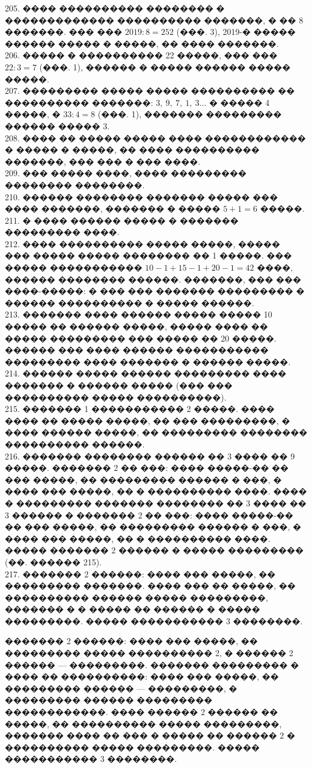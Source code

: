\documentclass[12pt]{article}
\begin{document}
205. ���� ���������� �������� � ������������� ���������� �������, � �� 8 �������. ��� ��� $2019:8=252$ (���. 3), 2019-� ����� ������ ����� � �����, �� ���� �������.\\
206. ����� � ���������� 22 �����, ��� ��� $22:3=7$ (���. 1), ������ � ����� ������ ����� �����.\\
207. ��������� ����� ����� ���������� �� ���������� �������: $3,\ 9,\ 7,\ 1,\ 3\ldots$ � ����� 4 �����, � $33:4=8$ (���. 1), ������� ��������� ������ ����� 3.\\
208. ���� �� ����� ����� ���� ������������ � ����� � �����, �� ���� ���������� �������, ��� ��� � ��� ����.\\
209. ��� ����� ����, ���� ��������� �������� ��������.\\
210. ������ �������� ������� ����� ��� ���� �������, ������� � ����� $5+1=6$ �����.\\
211. � ���� ������ ����� � ������� ��������� ����.\\
212. ���� ���������� ����� �����, ����� ��� ����� ����� �������� �� 1 �����. ��� ����� ����������� $10-1+15-1+20-1=42$ ����, ������ �������� ������. �������, ��� ��� ����-�����: � ��� ��� ������� ��������� � ������ ���������� � ����� ������.\\
213. ������� ���� ������ ����� ����� 10 ����� �� ������ �����, ����� ���� �� ����� ��������� ��� ����� �� 20 �����. ������ ��� ���� ������ ����������� ��������� ���� ������� � ������ �����.\\
214. ������ ����� ������ ��������� ���� ������� � ������ ����� (��� ��� ���������� ����� ����������).\\
215. ������� 1 ����������� 2 �����. ���� ���� �� ����� �����, �� ��� ���������, � ���� ������ �����, �� ��������� �������� ���������� ������.\\
216. ������� �������� ������ �� 3 ���� �� 9 �����. ������� 2 �� ���: ���� �����-�� �� ��� �����, �� ��������� ������ � ���, � ���� ��� �����, �� � ���������� ����. ���� � ��������� ������� �������� �� 3 ���� �� 3 ������ � ������� 2 �� ���:  ���� �����-�� �� ��� �����, �� ��������� ������ � ���, � ���� ��� �����, �� � ���������� ����. ����� ������� 2 ������ � ����� ��������� (��. ������ 215).\\
217. ������� 2 ������: ���� ��� �����, �� ��������� �������. ���� ��� �� �����, �� ���������� ������ ����� ���������, ������� � � ����� �� ������ � ����� ���������. ����� ����������� 3 ��������.

������� 2 ������: ���� ��� �����, �� ��������� ����� ���������� 2, � ������ 2 ������ --- ���������. ������� ��������� � ���� �� ����������: ���� ��� �����, �� ��������� ������ --- ���������, � ��������� ������ ��������� ������������. ���� ������ 2 ������ �� �����, �� ���������� ����� ���������, ������� ���� �� ��� � ����� �� ������ 2 � ���������� ����� ���������. ����� ����������� 3 ��������.
\end{document}
